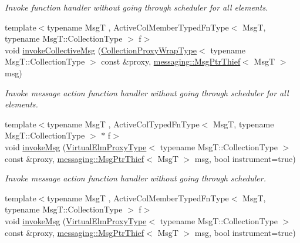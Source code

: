 \begin{DoxyCompactItemize}
\begin{DoxyCompactList}\small\item\em Invoke function handler without going through scheduler for all elements. \end{DoxyCompactList}\item 
{\footnotesize template$<$typename MsgT , Active\+Col\+Member\+Typed\+Fn\+Type$<$ Msg\+T, typename Msg\+T\+::\+Collection\+Type $>$ f$>$ }\\void \hyperlink{structvt_1_1vrt_1_1collection_1_1_collection_manager_aecbe91648c89bff4635fbd782ccd458a}{invoke\+Collective\+Msg} (\hyperlink{structvt_1_1vrt_1_1collection_1_1_collection_manager_a56458ed7f9bb22b631b9b3a745f42f94}{Collection\+Proxy\+Wrap\+Type}$<$ typename Msg\+T\+::\+Collection\+Type $>$ const \&proxy, \hyperlink{structvt_1_1messaging_1_1_msg_ptr_thief}{messaging\+::\+Msg\+Ptr\+Thief}$<$ MsgT $>$ msg)
\begin{DoxyCompactList}\small\item\em Invoke message action function handler without going through scheduler for all elements. \end{DoxyCompactList}\item 
{\footnotesize template$<$typename MsgT , Active\+Col\+Typed\+Fn\+Type$<$ Msg\+T, typename Msg\+T\+::\+Collection\+Type $>$ $\ast$ f$>$ }\\void \hyperlink{structvt_1_1vrt_1_1collection_1_1_collection_manager_accc84ffa2eb3851892143aad927dd799}{invoke\+Msg} (\hyperlink{namespacevt_1_1vrt_a620a5c8c59d13e513f690c74b4af516f}{Virtual\+Elm\+Proxy\+Type}$<$ typename Msg\+T\+::\+Collection\+Type $>$ const \&proxy, \hyperlink{structvt_1_1messaging_1_1_msg_ptr_thief}{messaging\+::\+Msg\+Ptr\+Thief}$<$ MsgT $>$ msg, bool instrument=true)
\begin{DoxyCompactList}\small\item\em Invoke message action function handler without going through scheduler. \end{DoxyCompactList}\item 
{\footnotesize template$<$typename MsgT , Active\+Col\+Member\+Typed\+Fn\+Type$<$ Msg\+T, typename Msg\+T\+::\+Collection\+Type $>$ f$>$ }\\void \hyperlink{structvt_1_1vrt_1_1collection_1_1_collection_manager_accc84ffa2eb3851892143aad927dd799}{invoke\+Msg} (\hyperlink{namespacevt_1_1vrt_a620a5c8c59d13e513f690c74b4af516f}{Virtual\+Elm\+Proxy\+Type}$<$ typename Msg\+T\+::\+Collection\+Type $>$ const \&proxy, \hyperlink{structvt_1_1messaging_1_1_msg_ptr_thief}{messaging\+::\+Msg\+Ptr\+Thief}$<$ MsgT $>$ msg, bool instrument=true)

\end{DoxyCompactItemize}

